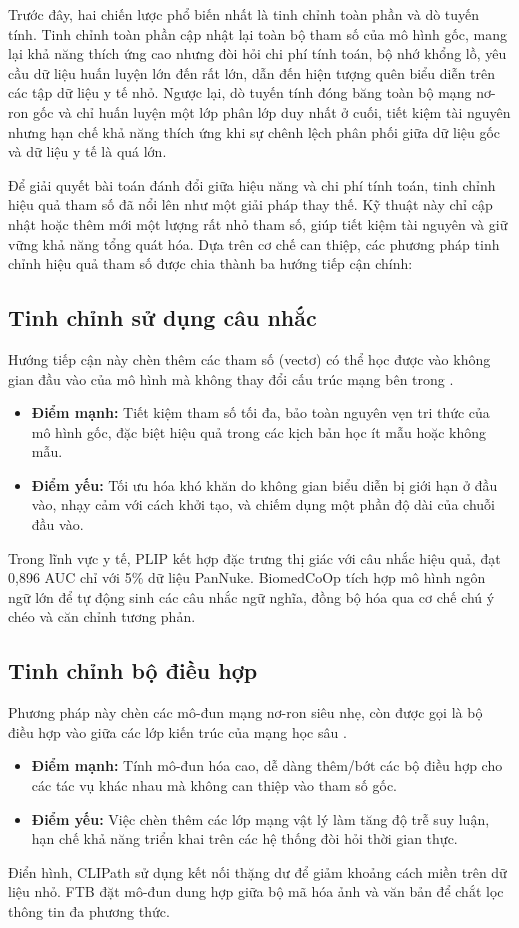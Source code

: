 Trước đây, hai chiến lược phổ biến nhất là tinh chỉnh toàn phần và dò tuyến tính. Tinh chỉnh toàn phần cập nhật lại toàn bộ tham số của mô hình gốc, mang lại khả năng thích ứng cao nhưng đòi hỏi chi phí tính toán, bộ nhớ khổng lồ, yêu cầu dữ liệu huấn luyện lớn đến rất lớn, dẫn đến hiện tượng quên biểu diễn trên các tập dữ liệu y tế nhỏ. Ngược lại, dò tuyến tính đóng băng toàn bộ mạng nơ-ron gốc và chỉ huấn luyện một lớp phân lớp duy nhất ở cuối, tiết kiệm tài nguyên nhưng hạn chế khả năng thích ứng khi sự chênh lệch phân phối giữa dữ liệu gốc và dữ liệu y tế là quá lớn.

Để giải quyết bài toán đánh đổi giữa hiệu năng và chi phí tính toán, tinh chỉnh hiệu quả tham số đã nổi lên như một giải pháp thay thế. Kỹ thuật này chỉ cập nhật hoặc thêm mới một lượng rất nhỏ tham số, giúp tiết kiệm tài nguyên và giữ vững khả năng tổng quát hóa. Dựa trên cơ chế can thiệp, các phương pháp tinh chỉnh hiệu quả tham số được chia thành ba hướng tiếp cận chính:

\subsection{Tinh chỉnh sử dụng câu nhắc}
Hướng tiếp cận này chèn thêm các tham số (vectơ) có thể học được vào không gian đầu vào của mô hình mà không thay đổi cấu trúc mạng bên trong \cite{Lester2021PromptTuning}.
\begin{itemize}
    \item \textbf{Điểm mạnh:} Tiết kiệm tham số tối đa, bảo toàn nguyên vẹn tri thức của mô hình gốc, đặc biệt hiệu quả trong các kịch bản học ít mẫu hoặc không mẫu.
    \item \textbf{Điểm yếu:} Tối ưu hóa khó khăn do không gian biểu diễn bị giới hạn ở đầu vào, nhạy cảm với cách khởi tạo, và chiếm dụng một phần độ dài của chuỗi đầu vào.
\end{itemize}
Trong lĩnh vực y tế, PLIP \cite{PLIP} kết hợp đặc trưng thị giác với câu nhắc hiệu quả, đạt 0,896 AUC chỉ với 5\% dữ liệu PanNuke. BiomedCoOp \cite{BiomedCoOp} tích hợp mô hình ngôn ngữ lớn để tự động sinh các câu nhắc ngữ nghĩa, đồng bộ hóa qua cơ chế chú ý chéo và căn chỉnh tương phản.

\subsection{Tinh chỉnh bộ điều hợp}
Phương pháp này chèn các mô-đun mạng nơ-ron siêu nhẹ, còn được gọi là bộ điều hợp vào giữa các lớp kiến trúc của mạng học sâu \cite{Houlsby2019Adapters}.
\begin{itemize}
    \item \textbf{Điểm mạnh:} Tính mô-đun hóa cao, dễ dàng thêm/bớt các bộ điều hợp cho các tác vụ khác nhau mà không can thiệp vào tham số gốc.
    \item \textbf{Điểm yếu:} Việc chèn thêm các lớp mạng vật lý làm tăng độ trễ suy luận, hạn chế khả năng triển khai trên các hệ thống đòi hỏi thời gian thực.
\end{itemize}
Điển hình, CLIPath \cite{CLIPath} sử dụng kết nối thặng dư để giảm khoảng cách miền trên dữ liệu nhỏ. FTB \cite{FTB} đặt mô-đun dung hợp giữa bộ mã hóa ảnh và văn bản để chắt lọc thông tin đa phương thức.

